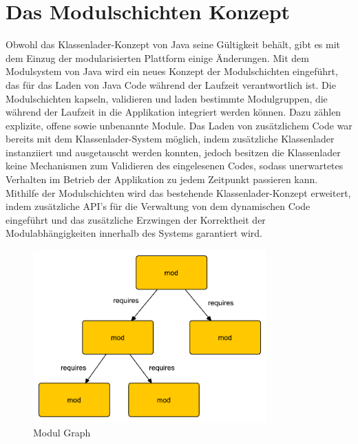   \section{Das Modulschichten Konzept} \label{sec:module_layers}
     Obwohl das Klassenlader-Konzept von Java seine Gültigkeit behält, gibt es mit dem Einzug der modularisierten Plattform einige Änderungen.\newline 
     Mit dem Modulsystem von Java wird ein neues Konzept der Modulschichten eingeführt, das für das Laden von Java Code während der Laufzeit verantwortlich ist. Die Modulschichten kapseln, validieren und laden bestimmte Modulgruppen, die während der Laufzeit in die Applikation integriert werden können. Dazu zählen explizite, offene sowie unbenannte Module. \newline 
     Das Laden von zusätzlichem Code war bereits mit dem Klassenlader-System möglich, indem zusätzliche Klassenlader instanziiert und ausgetauscht werden konnten, jedoch besitzen die Klassenlader keine Mechanismen zum Validieren des eingelesenen Codes, sodass unerwartetes Verhalten im Betrieb der Applikation zu jedem Zeitpunkt passieren kann. \newline
     Mithilfe der Modulschichten wird das bestehende Klassenlader-Konzept erweitert, indem zusätzliche API's für die Verwaltung von dem dynamischen Code eingeführt und das zusätzliche Erzwingen der Korrektheit der Modulabhängigkeiten innerhalb des Systems garantiert wird.\bigbreak

    \begin{figure}[h!]
      \centering
      \includegraphics[width=0.8\textwidth]{material/images/module-graph.pdf}
      \caption{Modul Graph \cite{javaMod9}}
      \label{fig:module-graph}
    \end{figure}

